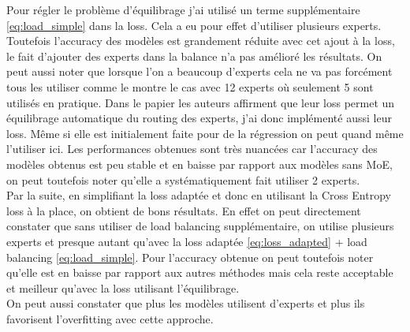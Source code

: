 \documentclass{article}
\begin{document}
Pour régler le problème d'équilibrage j'ai utilisé un terme supplémentaire \eqref{eq:load_simple} dans la loss. Cela a eu pour effet d'utiliser plusieurs experts. Toutefois l'accuracy des modèles est grandement réduite avec cet ajout à la loss, le fait d'ajouter des experts dans la balance n'a pas amélioré les résultats. On peut aussi noter que lorsque l'on a beaucoup d'experts cela ne va pas forcément tous les utiliser comme le montre le cas avec 12 experts où seulement 5 sont utilisés en pratique. Dans le papier \cite{paper1}les auteurs affirment que leur loss permet un équilibrage automatique du routing des experts, j'ai donc implémenté aussi leur loss. Même si elle est initialement faite pour de la régression on peut quand même l'utiliser ici. Les performances obtenues sont très nuancées car l'accuracy des modèles obtenus est peu stable et en baisse par rapport aux modèles sans MoE, on peut toutefois noter qu'elle a systématiquement fait utiliser 2 experts. \\
Par la suite, en simplifiant la loss adaptée et donc en utilisant la Cross Entropy loss à la place, on obtient de bons résultats. En effet on peut directement constater que sans utiliser de load balancing supplémentaire, on utilise plusieurs experts et presque autant qu'avec la loss adaptée \eqref{eq:loss_adapted} + load balancing \eqref{eq:load_simple}. Pour l'accuracy obtenue on peut toutefois noter qu'elle est en baisse par rapport aux autres méthodes mais cela reste acceptable et meilleur qu'avec la loss utilisant l'équilibrage. \\
On peut aussi constater que plus les modèles utilisent d'experts et plus ils favorisent l'overfitting avec cette approche.
\end{document}

